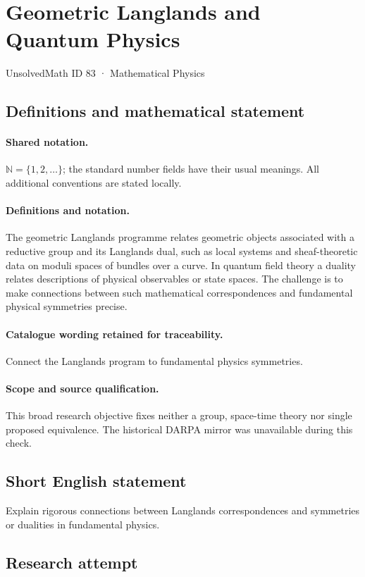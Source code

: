 \documentclass[11pt]{article}
\begin{document}
\setcounter{section}{82}
\section{Geometric Langlands and Quantum Physics}\label{83}
{\small UnsolvedMath ID 83 · Mathematical Physics}
\subsection{Definitions and mathematical statement}

\paragraph{Shared notation.}$\mathbb N=\{1,2,\ldots\}$; the standard number fields have their usual meanings. All additional conventions are stated locally.


\paragraph{Definitions and notation.}The geometric Langlands programme relates geometric objects associated with a reductive group and its Langlands dual, such as local systems and sheaf-theoretic data on moduli spaces of bundles over a curve. In quantum field theory a duality relates descriptions of physical observables or state spaces. The challenge is to make connections between such mathematical correspondences and fundamental physical symmetries precise.

\paragraph{Catalogue wording retained for traceability.}
Connect the Langlands program to fundamental physics symmetries.
\paragraph{Scope and source qualification.}This broad research objective fixes neither a group, space-time theory nor single proposed equivalence. The historical DARPA mirror was unavailable during this check.
\subsection{Short English statement}
Explain rigorous connections between Langlands correspondences and symmetries or dualities in fundamental physics.
\subsection{Research attempt}
\end{document}
